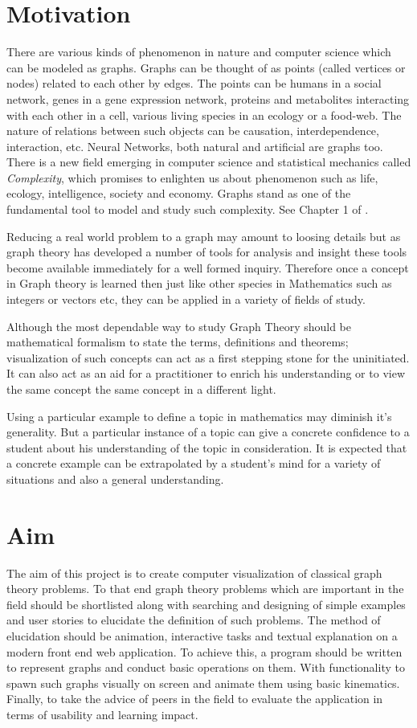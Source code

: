 
\section{Motivation}
There are various kinds of phenomenon in nature and computer science which can
be modeled as graphs. Graphs can be thought of as points (called vertices or
nodes) related to each other by edges. The points can be humans in a social
network, genes in a gene expression network, proteins and metabolites
interacting with each other in a cell, various living species in an ecology or
a food-web. The nature of relations between such objects can be causation,
interdependence, interaction, etc.  Neural Networks, both natural and
artificial are graphs too.  There is a new field emerging in computer science
and statistical mechanics called \emph{Complexity}, which promises to enlighten
us about phenomenon such as life, ecology, intelligence, society and economy.
Graphs stand as one of the fundamental tool to model and study such complexity.
See Chapter 1 of \cite{Gros2015}.

Reducing a real world problem to a graph may amount to loosing details but as
graph theory has developed a number of tools for analysis and insight these
tools become available immediately for a well formed inquiry. Therefore once a
concept in Graph theory is learned then just like other species in Mathematics
such as integers or vectors etc, they can be applied in a variety of fields of
study.

Although the most dependable way to study Graph Theory should be mathematical
formalism to state the terms, definitions and theorems; visualization of such
concepts can act as a first stepping stone for the uninitiated. It can also act
as an aid for a practitioner to enrich his understanding or to view the same
concept the same concept in a different light.

Using a particular example to define a topic in mathematics may diminish it's
generality. But a particular instance of a topic can give a concrete confidence
to a student about his understanding of the topic in consideration. It is
expected that a concrete example can be extrapolated by a student's mind for a
variety of situations and also a general understanding.

\section{Aim}
The aim of this project is to create computer visualization of classical graph
theory problems. To that end graph theory problems which are important in the
field should be shortlisted along with searching and designing of simple
examples and user stories to elucidate the definition of such problems.
The method of elucidation should be animation, interactive tasks and textual
explanation on a modern front end web application. To achieve this, a program
should be written to represent graphs and conduct basic operations on them.
With functionality to spawn such graphs visually on screen and animate them
using basic kinematics. Finally, to take the advice of peers in the field to
evaluate the application in terms of usability and learning impact.


